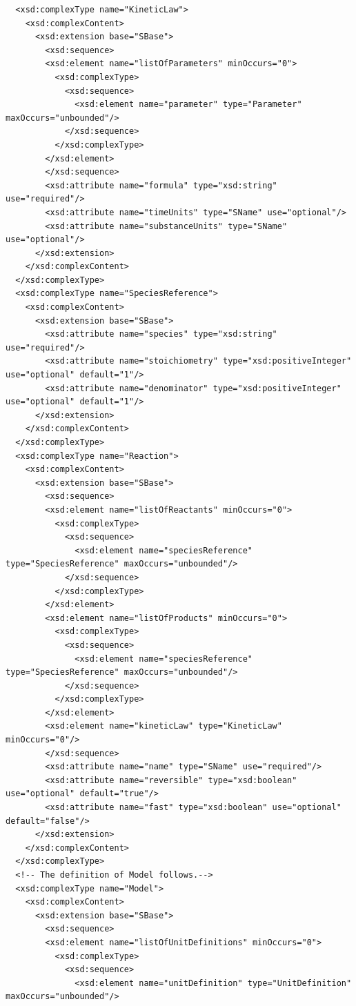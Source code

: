 \documentclass[10pt]{cekarticle}
\newenvironment{blockChanged}{\color{BrickRed}}{}
\begin{document}
\begin{blockChanged}
\begin{small}
\begin{verbatim}
  <xsd:complexType name="KineticLaw">
    <xsd:complexContent>
      <xsd:extension base="SBase">
      	<xsd:sequence>
        <xsd:element name="listOfParameters" minOccurs="0">
          <xsd:complexType>
            <xsd:sequence>
              <xsd:element name="parameter" type="Parameter" maxOccurs="unbounded"/>
            </xsd:sequence>
          </xsd:complexType>
        </xsd:element>
      	</xsd:sequence>
      	<xsd:attribute name="formula" type="xsd:string" use="required"/>
      	<xsd:attribute name="timeUnits" type="SName" use="optional"/>
      	<xsd:attribute name="substanceUnits" type="SName" use="optional"/>
      </xsd:extension>
    </xsd:complexContent>
  </xsd:complexType>
  <xsd:complexType name="SpeciesReference">
    <xsd:complexContent>
      <xsd:extension base="SBase">
      	<xsd:attribute name="species" type="xsd:string" use="required"/>
      	<xsd:attribute name="stoichiometry" type="xsd:positiveInteger" use="optional" default="1"/>
      	<xsd:attribute name="denominator" type="xsd:positiveInteger" use="optional" default="1"/>
      </xsd:extension>
    </xsd:complexContent>
  </xsd:complexType>
  <xsd:complexType name="Reaction">
    <xsd:complexContent>
      <xsd:extension base="SBase">
      	<xsd:sequence>
        <xsd:element name="listOfReactants" minOccurs="0">
          <xsd:complexType>
            <xsd:sequence>
              <xsd:element name="speciesReference" type="SpeciesReference" maxOccurs="unbounded"/>
            </xsd:sequence>
          </xsd:complexType>
        </xsd:element>
        <xsd:element name="listOfProducts" minOccurs="0">
          <xsd:complexType>
            <xsd:sequence>
              <xsd:element name="speciesReference" type="SpeciesReference" maxOccurs="unbounded"/>
            </xsd:sequence>
          </xsd:complexType>
        </xsd:element>
        <xsd:element name="kineticLaw" type="KineticLaw" minOccurs="0"/>
      	</xsd:sequence>
      	<xsd:attribute name="name" type="SName" use="required"/>
      	<xsd:attribute name="reversible" type="xsd:boolean" use="optional" default="true"/>
      	<xsd:attribute name="fast" type="xsd:boolean" use="optional" default="false"/>
      </xsd:extension>
    </xsd:complexContent>
  </xsd:complexType>
  <!-- The definition of Model follows.-->
  <xsd:complexType name="Model">
    <xsd:complexContent>
      <xsd:extension base="SBase">
      	<xsd:sequence>
        <xsd:element name="listOfUnitDefinitions" minOccurs="0">
          <xsd:complexType>
            <xsd:sequence>
              <xsd:element name="unitDefinition" type="UnitDefinition" maxOccurs="unbounded"/>

\end{verbatim}
\end{small}
\end{blockChanged}
\end{document}
